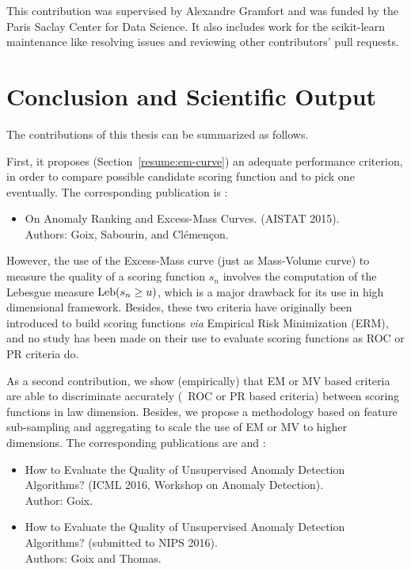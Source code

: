 This contribution was supervised by Alexandre Gramfort and was funded by the Paris Saclay Center for Data Science. It also includes work for the scikit-learn maintenance like resolving issues and reviewing other contributors' pull requests.



\section{Conclusion and Scientific Output}
The contributions of this thesis can be summarized as follows. 

First, it proposes (Section~\ref{resume:em-curve}) an adequate performance criterion, in order to compare possible candidate scoring function and to pick one eventually. 
The corresponding publication is \cite{AISTAT15}:
\begin{itemize}
\item On Anomaly Ranking and Excess-Mass Curves. (AISTAT 2015).\\
Authors: Goix, Sabourin, and Clémençon. 
\end{itemize}

However, the use of the Excess-Mass curve (just as Mass-Volume curve) to measure the quality of a scoring function $s_n$ involves the computation of the Lebesgue measure  $\text{Leb}(s_n \ge u)$, which is a major drawback for its use in high dimensional framework. Besides, these two criteria
have originally been introduced to build scoring functions \emph{via}
Empirical Risk Minimization (ERM), and no study has been made on their use to evaluate scoring functions as ROC or PR criteria do.

As a second contribution, we show (empirically) that EM or MV based criteria are able to discriminate accurately (\wrt~ROC or PR based criteria) between scoring functions in law dimension. Besides, we propose a methodology based on feature sub-sampling and aggregating to scale the use of EM or MV to higher dimensions.
The corresponding publications are \cite{ICMLworkshop16} and \cite{NIPS16evaluation}:
\begin{itemize}
\item How to Evaluate the Quality of Unsupervised Anomaly Detection Algorithms? (ICML 2016, Workshop on Anomaly Detection). %
  \\
Author: Goix. 
\item How to Evaluate the Quality of Unsupervised Anomaly Detection Algorithms? (submitted to NIPS 2016).\\ Authors: Goix and Thomas. 
\end{itemize}


